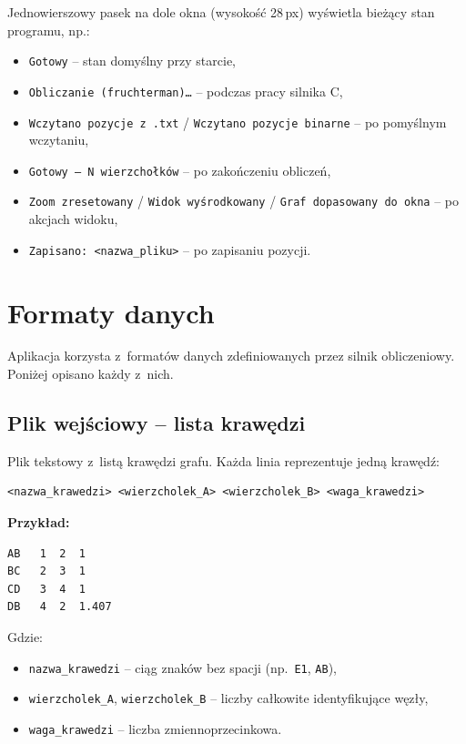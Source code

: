 \documentclass[12pt,a4paper]{article}
\begin{document}
Jednowierszowy pasek na dole okna (wysokość 28\,px) wyświetla bieżący stan programu, np.:
\begin{itemize}
    \item \texttt{Gotowy} -- stan domyślny przy starcie,
    \item \texttt{Obliczanie (fruchterman)\ldots} -- podczas pracy silnika C,
    \item \texttt{Wczytano pozycje z .txt} / \texttt{Wczytano pozycje binarne} -- po pomyślnym wczytaniu,
    \item \texttt{Gotowy --- N wierzchołków} -- po zakończeniu obliczeń,
    \item \texttt{Zoom zresetowany} / \texttt{Widok wyśrodkowany} / \texttt{Graf dopasowany do okna} -- po akcjach widoku,
    \item \texttt{Zapisano: <nazwa\_pliku>} -- po zapisaniu pozycji.
\end{itemize}

\section{Formaty danych}

Aplikacja korzysta z~formatów danych zdefiniowanych przez silnik obliczeniowy. Poniżej opisano każdy z~nich.

\subsection{Plik wejściowy -- lista krawędzi}

Plik tekstowy z~listą krawędzi grafu. Każda linia reprezentuje jedną krawędź:

\begin{lstlisting}
<nazwa_krawedzi> <wierzcholek_A> <wierzcholek_B> <waga_krawedzi>
\end{lstlisting}

\vspace{0.3cm}
\noindent \textbf{Przykład:}
\begin{lstlisting}
AB   1  2  1
BC   2  3  1
CD   3  4  1
DB   4  2  1.407
\end{lstlisting}

\noindent Gdzie:
\begin{itemize}
    \item \texttt{nazwa\_krawedzi} -- ciąg znaków bez spacji (np.~\texttt{E1}, \texttt{AB}),
    \item \texttt{wierzcholek\_A}, \texttt{wierzcholek\_B} -- liczby całkowite identyfikujące węzły,
    \item \texttt{waga\_krawedzi} -- liczba zmiennoprzecinkowa.
\end{itemize}
\end{document}
